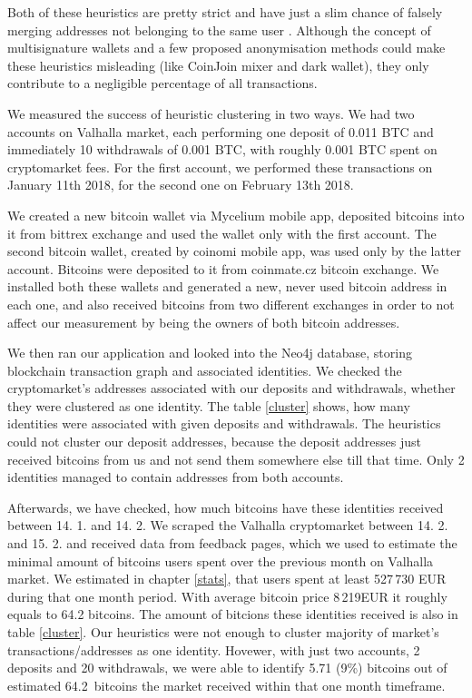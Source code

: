 \documentclass[
  digital, %
  table,   %
  lof,     %
  lot,     %
  oneside
]{fithesis3}
\begin{document}
Both of these heuristics are pretty strict and have just a slim chance of falsely merging
addresses not belonging to the same user \parencite{androulaki2013evaluating}.
Although the concept of multisignature wallets and a few proposed anonymisation methods could make
these heuristics misleading (like CoinJoin mixer and dark wallet), they only contribute to a 
negligible percentage of all transactions.

We measured the success of heuristic clustering in two ways.
We had two accounts on Valhalla market, each performing one deposit of 0.011 BTC and immediately 10 withdrawals of
0.001 BTC, with roughly 0.001 BTC spent on cryptomarket fees.
For the first account, we performed these transactions on January 11th 2018, for the second one on February 13th 2018.

We created a new bitcoin wallet via Mycelium mobile app, deposited bitcoins into it
from bittrex exchange and used the wallet only with the first account.
The second bitcoin wallet, created by coinomi mobile app, was used only by the latter account. 
Bitcoins were deposited to it from coinmate.cz bitcoin exchange.
We installed both these wallets and generated a new, never used bitcoin address in each one, and also
received bitcoins from two different exchanges in order to not affect
our measurement by being the owners of both bitcoin addresses.

We then ran our application and looked into the Neo4j database, storing
blockchain transaction graph and associated identities.
We checked the cryptomarket's addresses associated with our deposits and withdrawals,
whether they were clustered as one identity. The table \ref{cluster} shows, how many identities
were associated with given deposits and withdrawals. The heuristics could not cluster our
deposit addresses, because the deposit addresses just received bitcoins from us and not send them
somewhere else till that time. Only 2 identities managed to contain addresses from both accounts.

Afterwards, we have checked, how much bitcoins have these
identities received between 14. 1. and 14. 2. We scraped the Valhalla cryptomarket between 14. 2. and 15. 2.
and received data from feedback pages, which we used to estimate 
the minimal amount of bitcoins users spent over the previous month on Valhalla market.
We estimated in chapter \ref{stats}, that users spent at least 527\,730 EUR during that one month period.
With average bitcoin price 8\,219EUR it roughly equals to 64.2 bitcoins.
The amount of bitcions these identities received is also in table \ref{cluster}.
Our heuristics were not enough to cluster majority of market's transactions/addresses as one identity.
Hovewer, with just two accounts, 2 deposits and 20 withdrawals, we were able to identify 5.71 (9\%) bitcoins out of estimated
64.2~bitcoins the market received within that one month timeframe.
\end{document}
